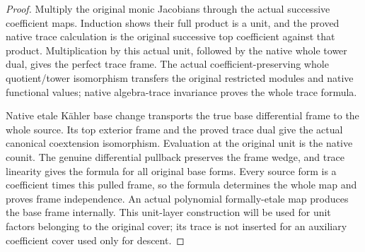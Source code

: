 \begin{proof}
Multiply the original monic Jacobians through the actual successive
coefficient maps.  Induction shows their full product is a unit, and
the proved native trace calculation is the original successive top
coefficient against that product.  Multiplication by this actual unit,
followed by the native whole tower dual, gives the perfect trace frame.
The actual coefficient-preserving whole quotient/tower isomorphism
transfers the original restricted modules and native functional values;
native algebra-trace invariance proves the whole trace formula.

Native etale K\"ahler base change transports the true base differential
frame to the whole source.  Its top exterior frame and the proved trace
dual give the actual canonical coextension isomorphism.  Evaluation at
the original unit is the native counit.  The genuine differential
pullback preserves the frame wedge, and trace linearity gives the
formula for all original base forms.  Every source form is a coefficient
times this pulled frame, so the formula determines the whole map and
proves frame independence.  An actual polynomial formally-etale map
produces the base frame internally.  This unit-layer construction will
be used for unit factors belonging to the original cover; its trace is
not inserted for an auxiliary coefficient cover used only for descent.
\end{proof}

